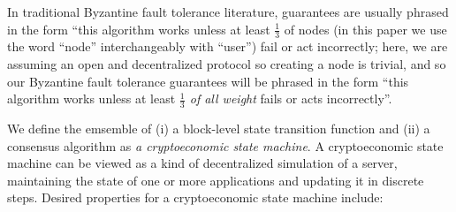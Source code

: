\documentclass[11pt,a4paper]{article}
\theoremstyle{plain}
\theoremstyle{definition}
\theoremstyle{remark}
\begin{document}
In traditional Byzantine fault tolerance literature, guarantees are usually phrased in the form ``this algorithm works unless at least $\frac{1}{3}$ of nodes (in this paper we use the word ``node'' interchangeably with ``user'') fail or act incorrectly; here, we are assuming an open and decentralized protocol so creating a node is trivial, and so our Byzantine fault tolerance guarantees will be phrased in the form ``this algorithm works unless at least \emph{$\frac{1}{3}$ of all weight} fails or acts incorrectly''.

We define the emsemble of (i) a block-level state transition function and (ii) a consensus algorithm as \emph{a cryptoeconomic state machine}. A cryptoeconomic state machine can be viewed as a kind of decentralized simulation of a server, maintaining the state of one or more applications and updating it in discrete steps. Desired properties for a cryptoeconomic state machine include:
\end{document}

